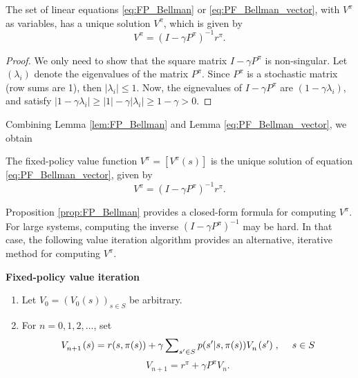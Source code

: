 \begin{lemma}\label{lem:FP_Bellman_sol} The set of linear equations \eqref{eq:FP_Bellman} or \eqref{eq:PF_Bellman_vector}, with ${V^\pi }$ as variables, has a unique solution ${V^\pi }$, which is given by \[{V^\pi } = {(I - \gamma {P^\pi })^{ - 1}}{r^\pi }.\]
\end{lemma}
\begin{proof} We only need to show that the square matrix $I - \gamma {P^\pi }$ is non-singular.  Let $({\lambda _i})$ denote the eigenvalues of the matrix ${P^\pi }$. Since ${P^\pi }$ is a stochastic matrix (row sums are 1), then $|{\lambda _i}| \le 1$. Now, the eignevalues of $I - \gamma {P^\pi }$ are $(1 - \gamma {\lambda _i})$, and satisfy $|1 - \gamma {\lambda _i}| \ge |1| - \gamma |{\lambda _i}| \ge 1 - \gamma  > 0$.                                                                                                            \end{proof}

Combining Lemma \ref{lem:FP_Bellman} and Lemma \ref{eq:PF_Bellman_vector}, we obtain

\begin{proposition}\label{prop:FP_Bellman} The fixed-policy value function ${V^\pi } = [{V^\pi }(s)]$ is the unique solution of equation \eqref{eq:PF_Bellman_vector}, given by \[{V^\pi } = {(I - \gamma {P^\pi })^{ - 1}}{r^\pi }.\]
\end{proposition}

Proposition \ref{prop:FP_Bellman} provides a closed-form formula for computing $V_{}^\pi$. For large systems, computing the inverse ${(I - \gamma {P^\pi })^{ - 1}}$ may be hard.  In that case, the following value iteration algorithm provides an alternative, iterative method for computing $V_{}^\pi$.

\begin{algorithm_}\textbf{Fixed-policy value iteration}
\begin{enumerate}
  \item Let ${V_0} = {({V_0}(s))_{s \in S}}$ be arbitrary.
  \item For $n = 0,1,2, \ldots $, set
\[V_{n + 1}^{}{\kern 1pt} (s) = r(s,\pi (s)) + \gamma \sum\nolimits_{s' \in S} {p(s'|s,\pi (s))V_n^{}{\kern 1pt} (s')} \;,\quad \;s \in S\]
\[{V_{n + 1}} = {r^\pi } + \gamma {P^\pi }{V_n}.\]
\end{enumerate}
\end{algorithm_}

